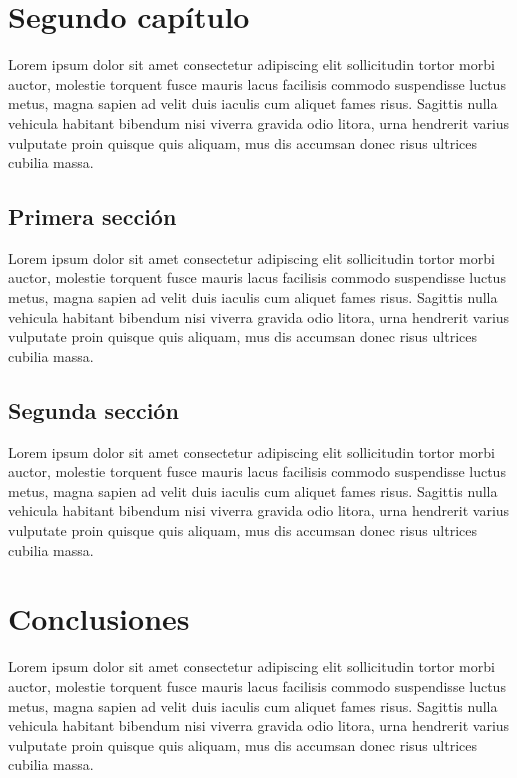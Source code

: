 \documentclass{uathesis-es}
\begin{document}

\chapter{Segundo capítulo}

Lorem ipsum dolor sit amet consectetur adipiscing elit sollicitudin tortor morbi auctor, molestie torquent fusce mauris lacus facilisis commodo suspendisse luctus metus, magna sapien ad velit duis iaculis cum aliquet fames risus. Sagittis nulla vehicula habitant bibendum nisi viverra gravida odio litora, urna hendrerit varius vulputate proin quisque quis aliquam, mus dis accumsan donec risus ultrices cubilia massa.

\section{Primera sección}

Lorem ipsum dolor sit amet consectetur adipiscing elit sollicitudin tortor morbi auctor, molestie torquent fusce mauris lacus facilisis commodo suspendisse luctus metus, magna sapien ad velit duis iaculis cum aliquet fames risus. Sagittis nulla vehicula habitant bibendum nisi viverra gravida odio litora, urna hendrerit varius vulputate proin quisque quis aliquam, mus dis accumsan donec risus ultrices cubilia massa.

\section{Segunda sección}

Lorem ipsum dolor sit amet consectetur adipiscing elit sollicitudin tortor morbi auctor, molestie torquent fusce mauris lacus facilisis commodo suspendisse luctus metus, magna sapien ad velit duis iaculis cum aliquet fames risus. Sagittis nulla vehicula habitant bibendum nisi viverra gravida odio litora, urna hendrerit varius vulputate proin quisque quis aliquam, mus dis accumsan donec risus ultrices cubilia massa.


\chapter{Conclusiones}

Lorem ipsum dolor sit amet consectetur adipiscing elit sollicitudin tortor morbi auctor, molestie torquent fusce mauris lacus facilisis commodo suspendisse luctus metus, magna sapien ad velit duis iaculis cum aliquet fames risus. Sagittis nulla vehicula habitant bibendum nisi viverra gravida odio litora, urna hendrerit varius vulputate proin quisque quis aliquam, mus dis accumsan donec risus ultrices cubilia massa.




\end{document}

